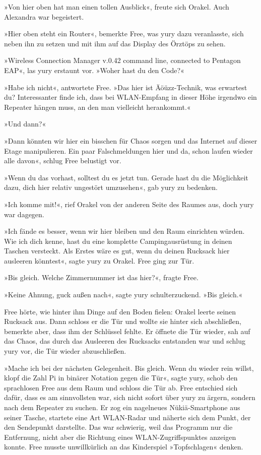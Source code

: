 »Von hier oben hat man einen tollen Ausblick«, freute sich Orakel. Auch Alexandra war begeistert.

»Hier oben steht ein Router«, bemerkte Free, was yury dazu veranlasste, sich neben ihn zu setzen und mit ihm auf das Display des Örztöps zu sehen.

»Wireless Connection Manager v.0.42 command line, connected to Pentagon EAP«, las yury erstaunt vor. »Woher hast du den Code?«

»Habe ich nicht«, antwortete Free. »Das hier ist Äöüzz-Technik, was erwartest du? Interessanter finde ich, dass bei WLAN-Empfang in dieser Höhe irgendwo ein Repeater hängen muss, an den man vielleicht herankommt.«

»Und dann?«

»Dann könnten wir hier ein bisschen für Chaos sorgen und das Internet auf dieser Etage manipulieren. Ein paar Falschmeldungen hier und da, schon laufen wieder alle davon«, schlug Free belustigt vor.

»Wenn du das vorhast, solltest du es jetzt tun. Gerade hast du die Möglichkeit dazu, dich hier relativ ungestört umzusehen«, gab yury zu bedenken.

»Ich komme mit!«, rief Orakel von der anderen Seite des Raumes aus, doch yury war dagegen.

»Ich fände es besser, wenn wir hier bleiben und den Raum einrichten würden. Wie ich dich kenne, hast du eine komplette Campingausrüstung in deinen Taschen versteckt. Als Erstes wäre es gut, wenn du deinen Rucksack hier ausleeren könntest«, sagte yury zu Orakel. Free ging zur Tür.

»Bis gleich. Welche Zimmernummer ist das hier?«, fragte Free.

»Keine Ahnung, guck außen nach«, sagte yury schulterzuckend. »Bis gleich.«

Free hörte, wie hinter ihm Dinge auf den Boden fielen: Orakel leerte seinen Rucksack aus. Dann schloss er die Tür und wollte sie hinter sich abschließen, bemerkte aber, dass ihm der Schlüssel fehlte. Er öffnete die Tür wieder, sah auf das Chaos, das durch das Ausleeren des Rucksacks entstanden war und schlug yury vor, die Tür wieder abzuschließen.

»Mache ich bei der nächsten Gelegenheit. Bis gleich. Wenn du wieder rein willst, klopf die Zahl Pi in binärer Notation gegen die Tür«, sagte yury, schob den sprachlosen Free aus dem Raum und schloss die Tür ab. Free entschied sich dafür, dass es am sinnvollsten war, sich nicht sofort über yury zu ärgern, sondern nach dem Repeater zu suchen. Er zog ein nagelneues Nükiä-Smartphone aus seiner Tasche, startete eine Art WLAN-Radar und näherte sich dem Punkt, der den Sendepunkt darstellte. Das war schwierig, weil das Programm nur die Entfernung, nicht aber die Richtung eines WLAN-Zugriffspunktes anzeigen konnte. Free musste unwillkürlich an das Kinderspiel »Topfschlagen« denken.

